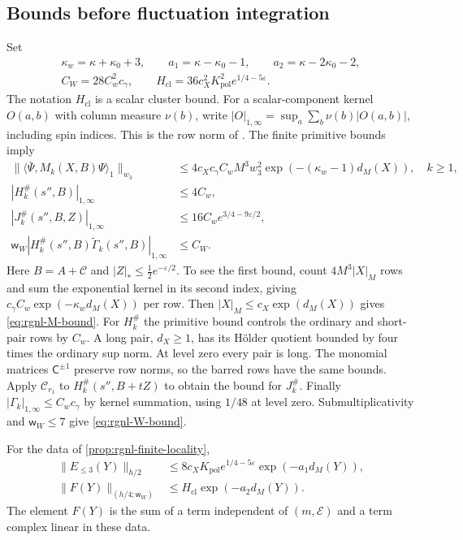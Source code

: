 \subsection{Bounds before fluctuation integration}
\label{subsec:rgnl-finite-bounds}

Set
\[
 \begin{gathered}
 \kappa_w=\kappa+\kappa_0+3,\qquad
 a_1=\kappa-\kappa_0-1,\qquad a_2=\kappa-2\kappa_0-2,\\
 C_W=28C_w^2c_\gamma,
 \qquad H_{\mathrm{cl}}=36c_X^2K_{\mathrm{pol}}^2e^{1/4-5\varepsilon}.
 \end{gathered}
\]
The notation $H_{\mathrm{cl}}$ is a scalar cluster bound. For a
scalar-component kernel $O(a,b)$ with column measure $\nu(b)$, write
$|O|_{1,\infty}=\sup_a\sum_b\nu(b)|O(a,b)|$, including spin indices.
This is the row norm of \cite[Theorem~B]{NormalizedContraction}.
The finite primitive bounds imply
\begin{align}
 \|\langle\bar\Psi,M_k(X,B)\Psi\rangle_1\|_{w_3}
 &\le4c_Xc_\gamma C_wM^3w_3^2
                   \exp(-(\kappa_w-1)d_M(X)),\quad k\ge1,
                                      \label{eq:rgnl-M-bound}\\
 |H_k^\#(s'',B)|_{1,\infty}&\le4C_w,\\
 |J_k^\#(s'',B,Z)|_{1,\infty}
                  &\le16C_we^{3/4-9\varepsilon/2},\\
 \mathsf w_W|H_k^\#(s'',B)\widetilde\Gamma_k(s'',B)|_{1,\infty}
                  &\le C_W.           \label{eq:rgnl-W-bound}
\end{align}
Here $B=A+\mathscr C$ and $|Z|_*\le\frac12e^{-\varepsilon/2}$.
To see the first bound, count $4M^3|X|_M$ rows and sum
the exponential kernel in its second index, giving
$c_\gamma C_w \exp(-\kappa_wd_M(X))$ per row.
Then $|X|_M\le c_X\exp(d_M(X))$ gives
\eqref{eq:rgnl-M-bound}.
For $H_k^\#$ the primitive bound controls the ordinary
and short-pair rows by $C_w$. A long pair, $d_X\ge1$,
has its H\"older quotient bounded by four times the
ordinary sup norm. At level zero every pair is long.
The monomial matrices $\mathsf C^{\pm1}$ preserve row norms,
so the barred rows have the same bounds.
Apply $\mathcal C_{r_1}$ to
$H_k^\#(s'',B+tZ)$ to obtain the bound for $J_k^\#$.
Finally $|\Gamma_k|_{1,\infty}\le C_wc_\gamma$ by kernel
summation, using $1/48$ at level zero. Submultiplicativity
and $\mathsf w_W\le7$ give \eqref{eq:rgnl-W-bound}.

\begin{proposition}\label{prop:rgnl-finite-bounds}
For the data of \cref{prop:rgnl-finite-locality},
\begin{align}
 \|E_{\le3}(Y)\|_{h/2}
       &\le8c_XK_{\mathrm{pol}}e^{1/4-5\varepsilon}\exp(-a_1d_M(Y)),
                                      \label{eq:rgnl-E3-bound}\\
 \|F(Y)\|_{(h/4;\mathsf w_W)}
       &\le H_{\mathrm{cl}}\exp(-a_2d_M(Y)).
                                      \label{eq:rgnl-F-bound}
\end{align}
The element $F(Y)$ is the sum of a term independent of
$(m,\mathscr E)$ and a term complex linear in these data.
\end{proposition}

